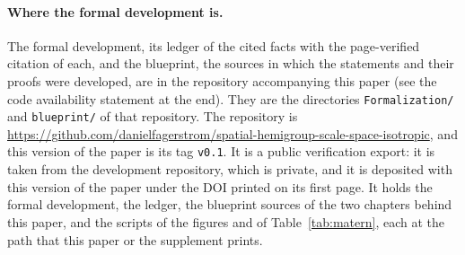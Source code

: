 \paragraph{Where the formal development is.} The formal development, its ledger of the cited
facts with the page-verified citation of each, and the blueprint, the sources in which the
statements and their proofs were developed, are in the repository accompanying this paper (see
the code availability statement at the end). They are the directories \texttt{Formalization/}
and \texttt{blueprint/} of that repository. The repository is
\url{https://github.com/danielfagerstrom/spatial-hemigroup-scale-space-isotropic},
and this version of the paper is its tag \texttt{v0.1}. It is a public verification export: it is
taken from the development repository, which is private, and it is
deposited with this version of the paper under the DOI printed on its first page. It holds
the formal development, the ledger, the blueprint sources of the two chapters behind this
paper, and the scripts of the figures and of Table~\ref{tab:matern}, each at the path that this
paper or the supplement prints.


